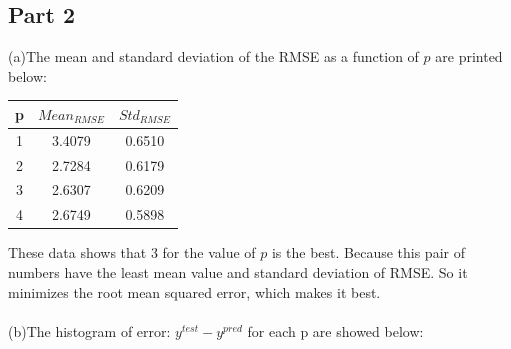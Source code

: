\documentclass{article}
\begin{document}
\subsection{Part 2}
(a)The mean and standard deviation of the RMSE as a function of $p$ are printed below:
\FloatBarrier
\begin{table}[h!]
\centering
\begin{tabular}{|c|c|c|}
 \hline
p  &   $Mean_{RMSE}$   &   $Std_{RMSE}$\\
\hline
1& 3.4079&    0.6510\\
\hline
2& 2.7284&    0.6179\\
\hline
3& 2.6307&    0.6209\\
\hline
4& 2.6749&    0.5898\\
\hline
\end{tabular}
\end{table}
\FloatBarrier
These data shows that 3 for the value of $p$ is the best. Because this pair of numbers have the least mean value and standard deviation of RMSE. So it minimizes the root mean squared error, which makes it best.\\\\
(b)The histogram of error: $y^{test} - y^{pred}$  for each p are showed below:\\
\FloatBarrier
\end{document}
